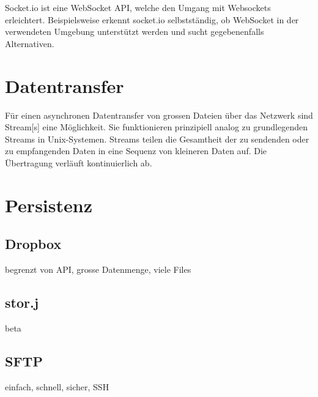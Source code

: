 Socket.io ist eine WebSocket API, welche den Umgang mit Websockets erleichtert. Beispielsweise erkennt socket.io selbstständig, ob Web\-So\-cket in der verwendeten Umgebung unterstützt werden und sucht gegebenenfalls Alternativen. \\\cite{WebSocke14:online, prusty2016modern}




\section{Datentransfer}

Für einen asynchronen Datentransfer von grossen Dateien über das Netzwerk sind \gls{Stream}[s] eine Möglichkeit. Sie funktionieren prinzipiell analog zu grundlegenden Streams in Unix-Systemen. Streams teilen die Gesamtheit der zu sendenden oder zu empfangenden Daten in eine Sequenz von kleineren Daten auf. Die Übertragung verläuft kontinuierlich ab.




\section{Persistenz}

\subsection{Dropbox}
begrenzt von API, grosse Datenmenge, viele Files

\subsection{stor.j}
beta

\subsection{\gls{SFTP}}
einfach, schnell, sicher, SSH
